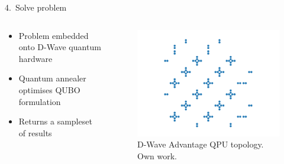 \documentclass[handout]{beamer}
\begin{document}
\begin{frame}{4.\ Solve problem}

    \begin{columns}
        \begin{column}{.5\textwidth}
            \begin{itemize}
                \item Problem embedded onto D-Wave quantum hardware
                \item Quantum annealer optimises QUBO formulation
                \item Returns a sampleset of results
            \end{itemize}
        \end{column}
        \begin{column}{.5\textwidth}
            \begin{figure}
                \includegraphics[width=\textwidth]{pegasus.pdf}
                \caption{D-Wave Advantage QPU topology. Own work.}
            \end{figure}
        \end{column}
    \end{columns}
    
\end{frame}
\end{document}
